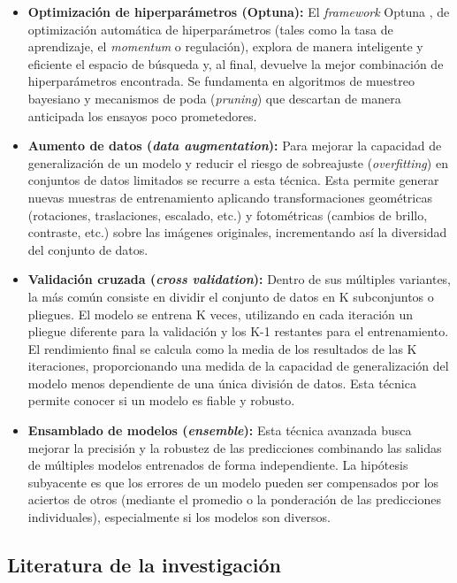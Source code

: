 \documentclass[12pt,a4paper,onecolumn,oneside]{report}
\begin{document}
\begin{itemize}
  \item \textbf{Optimización de hiperparámetros (Optuna):} El \textit{framework} Optuna \cite{optuna_github}, de optimización automática de hiperparámetros (tales como la tasa de aprendizaje, el \textit{momentum} o regulación), 
  explora de manera inteligente y eficiente el espacio de búsqueda y, al final, devuelve la mejor combinación de hiperparámetros encontrada. Se fundamenta en algoritmos de muestreo bayesiano y mecanismos de poda (\textit{pruning}) 
  que descartan de manera anticipada los ensayos poco prometedores.
  \item \textbf{Aumento de datos (\textit{data augmentation}):} Para mejorar la capacidad de generalización de un modelo y reducir el riesgo de sobreajuste (\textit{overfitting}) en conjuntos de datos limitados se recurre a esta técnica. 
  Esta permite generar nuevas muestras de entrenamiento aplicando transformaciones geométricas (rotaciones, traslaciones, escalado, etc.) y fotométricas (cambios de brillo, contraste, etc.) sobre las imágenes originales, 
  incrementando así la diversidad del conjunto de datos.
  \item \textbf{Validación cruzada (\textit{cross validation}):} Dentro de sus múltiples variantes, la más común consiste en dividir el conjunto de datos en K subconjuntos o pliegues. El modelo se entrena K veces, 
  utilizando en cada iteración un pliegue diferente para la validación y los K-1 restantes para el entrenamiento. El rendimiento final se calcula como la media de los resultados de las K iteraciones, proporcionando una medida de la capacidad 
  de generalización del modelo menos dependiente de una única división de datos. Esta técnica permite conocer si un modelo es fiable y robusto.
  \item \textbf{Ensamblado de modelos (\textit{ensemble}):} Esta técnica avanzada busca mejorar la precisión y la robustez de las predicciones combinando las salidas de múltiples modelos entrenados de forma independiente. 
  La hipótesis subyacente es que los errores de un modelo pueden ser compensados por los aciertos de otros (mediante el promedio o la ponderación de las predicciones individuales), especialmente si los modelos son diversos.
\end{itemize}

\subsection{Literatura de la investigación}
\end{document}
